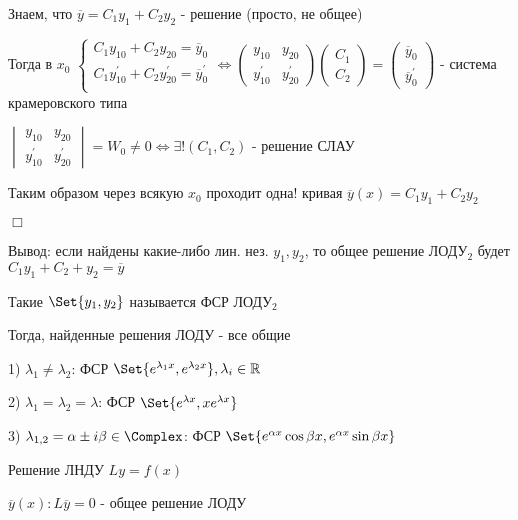 \documentclass[12pt]{article}
\begin{document}
    Знаем, что $\overline{y} = C_1 y_1 + C_2 y_2$ - решение (просто, не общее)

    Тогда в $x_0$ $\begin{cases}
                       C_1 y_{10} + C_2 y_{20} = \overline{y}_0 \\
                       C_1 y_{10}^\prime + C_2 y_{20}^\prime = \overline{y}_0^\prime \\
    \end{cases} \Longleftrightarrow \begin{pmatrix}y_{10} & y_{20} \\ y_{10}^\prime & y_{20}^\prime \end{pmatrix} \begin{pmatrix}C_1 \\ C_2\end{pmatrix} = \begin{pmatrix}\overline{y}_0 \\ \overline{y}^\prime_0\end{pmatrix}$ -
    система крамеровского типа

    $\begin{vmatrix}y_{10} & y_{20} \\ y^\prime_{10} & y^\prime_{20}\end{vmatrix} = W_0 \neq 0 \Longleftrightarrow \exists! (C_1, C_2)$ - решение СЛАУ

    Таким образом через всякую $x_0$ проходит одна! кривая $\overline{y}(x) = C_1 y_1 + C_2 y_2$

    $\Box$

    \Nota Вывод: если найдены какие-либо лин. нез. $y_1, y_2$, то общее решение ЛОДУ$_2$ будет $C_1 y_1 + C_2 + y_2 = \overline{y}$

    \Def Такие $\Set{y_1, y_2}$ называется ФСР ЛОДУ$_2$

    \Nota Тогда, найденные решения ЛОДУ - все общие

    1) $\lambda_1 \neq \lambda_2$: ФСР $\Set{e^{\lambda_1 x}, e^{\lambda_2 x}}, \lambda_i \in \Real$

    2) $\lambda_1 = \lambda_2 = \lambda$: ФСР $\Set{e^{\lambda x}, x e^{\lambda x}}$

    3) $\lambda_{1,2} = \alpha \pm i \beta \in \mathbb{\Complex}$: ФСР $\Set{e^{\alpha x} \cos\beta x, e^{\alpha x} \sin \beta x}$

     Решение ЛНДУ $Ly = f(x)$

    $\overline{y}(x): L\overline{y} = 0$ - общее решение ЛОДУ
\end{document}
